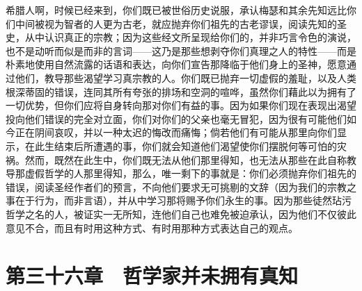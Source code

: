 希腊人啊，时候已经来到，你们既已被世俗历史说服，承认梅瑟和其余先知远比你们中间被视为智者的人更为古老，就应抛弃你们祖先的古老谬误，阅读先知的圣史，从中认识真正的宗教；因为这些经文所呈现给你们的，并非巧言令色的演说，也不是动听而似是而非的言词——这乃是那些想剥夺你们真理之人的特性——而是朴素地使用自然流露的话语和表达，向你们宣告那降临于他们身上的圣神，愿意通过他们，教导那些渴望学习真宗教的人。你们既已抛弃一切虚假的羞耻，以及人类根深蒂固的错误，连同其所有夸张的排场和空洞的喧哗，虽然你们藉此以为拥有了一切优势，但你们应将自身转向那对你们有益的事。因为如果你们现在表现出渴望投向他们错误的完全对立面，你们对你们的父亲也毫无冒犯，因为很有可能他们如今正在阴间哀叹，并以一种太迟的悔改而痛悔；倘若他们有可能从那里向你们显示，在此生结束后所遭遇的事，你们就会知道他们渴望使你们摆脱何等可怕的灾祸。然而，既然在此生中，你们既无法从他们那里得知，也无法从那些在此自称教导那虚假哲学的人那里得知，那么，唯一剩下的事就是：你们必须抛弃你们祖先的错误，阅读圣经作者们的预言，不向他们要求无可挑剔的文辞（因为我们的宗教之事在于行为，而非言语），并从中学习那将赐予你们永生的事。因为那些徒然玷污哲学之名的人，被证实一无所知，连他们自己也难免被迫承认，因为他们不仅彼此意见不合，而且有时用这种方式、有时用那种方式表达自己的观点。\par


\section{第三十六章　哲学家并未拥有真知}

